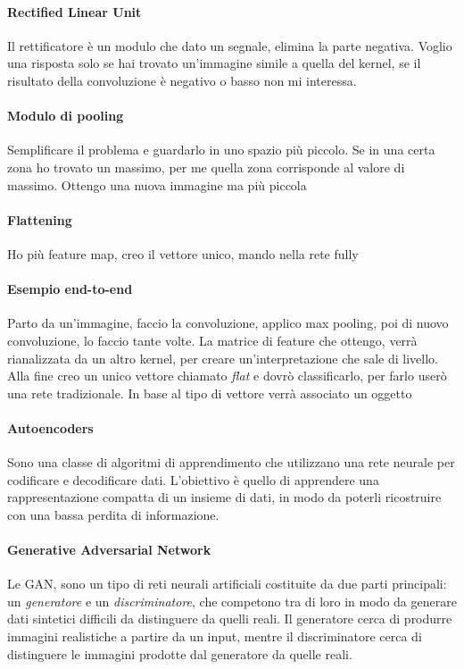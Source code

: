 \paragraph{Rectified Linear Unit}
Il rettificatore è un modulo che dato un segnale, elimina la parte negativa. Voglio una risposta solo se hai trovato un’immagine simile a quella del kernel, se il risultato della convoluzione è negativo o basso non mi interessa. 

\paragraph{Modulo di pooling}
Semplificare il problema e guardarlo in uno spazio più piccolo. Se in una certa zona ho trovato un massimo, per me quella zona corrisponde al valore di massimo. Ottengo una nuova immagine ma più piccola

\paragraph{Flattening}
Ho più feature map, creo il vettore unico, mando nella rete fully

\paragraph{Esempio end-to-end}
Parto da un'immagine, faccio la convoluzione, applico max pooling, poi di nuovo convoluzione, lo faccio tante volte. La matrice di feature che ottengo, verrà rianalizzata da un altro kernel, per creare un’interpretazione che sale di livello. Alla fine creo un unico vettore chiamato \textit{flat} e dovrò classificarlo, per farlo userò una rete tradizionale. In base al tipo di vettore verrà associato un oggetto

\paragraph{Autoencoders}
Sono una classe di algoritmi di apprendimento che utilizzano una rete neurale per codificare e decodificare dati. L'obiettivo è quello di apprendere una rappresentazione compatta di un insieme di dati, in modo da poterli ricostruire con una bassa perdita di informazione.

\paragraph{Generative Adversarial Network}
Le GAN, sono un tipo di reti neurali artificiali costituite da due parti principali: un \textit{generatore} e un \textit{discriminatore}, che competono tra di loro in modo da generare dati sintetici difficili da distinguere da quelli reali. Il generatore cerca di produrre immagini realistiche a partire da un input, mentre il discriminatore cerca di distinguere le immagini prodotte dal generatore da quelle reali.

\newpage